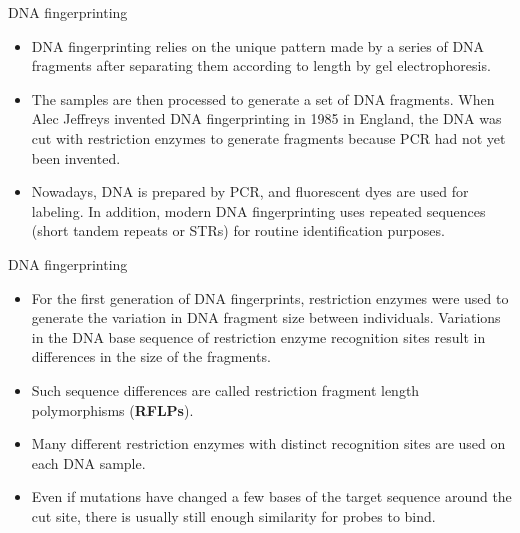\documentclass[
  ignorenonframetext,
  aspectratio=169]{beamer}
\providecommand{\tightlist}{%
  \setlength{\itemsep}{0pt}\setlength{\parskip}{0pt}}
\begin{document}
\begin{frame}{DNA fingerprinting}
\protect\hypertarget{dna-fingerprinting}{}
\begin{itemize}
\tightlist
\item
  DNA fingerprinting relies on the unique pattern made by a series of
  DNA fragments after separating them according to length by gel
  electrophoresis.
\item
  The samples are then processed to generate a set of DNA fragments.
  When Alec Jeffreys invented DNA fingerprinting in 1985 in England, the
  DNA was cut with restriction enzymes to generate fragments because PCR
  had not yet been invented.
\item
  Nowadays, DNA is prepared by PCR, and fluorescent dyes are used for
  labeling. In addition, modern DNA fingerprinting uses repeated
  sequences (short tandem repeats or STRs) for routine identification
  purposes.
\end{itemize}
\end{frame}

\begin{frame}{DNA fingerprinting}
\protect\hypertarget{dna-fingerprinting-1}{}
\begin{itemize}
\tightlist
\item
  For the first generation of DNA fingerprints, restriction enzymes were
  used to generate the variation in DNA fragment size between
  individuals. Variations in the DNA base sequence of restriction enzyme
  recognition sites result in differences in the size of the fragments.
\item
  Such sequence differences are called restriction fragment length
  polymorphisms (\textbf{RFLPs}).
\item
  Many different restriction enzymes with distinct recognition sites are
  used on each DNA sample.
\item
  Even if mutations have changed a few bases of the target sequence
  around the cut site, there is usually still enough similarity for
  probes to bind.
\end{itemize}
\end{frame}
\end{document}

